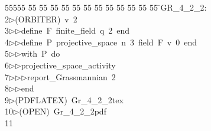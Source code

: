 %
%
\begin{tabbing}
55555 \= 55 \= 55 \= 55 \= 55 \= 55 \= 55 \= 55 \= 55 \= 55 \= 55 \= 55 \= 55 \= \>GR\_4\_2\_2:\\[0pt]
2\>$\triangleright$\>(ORBITER)\ v\ 2\ \\[0pt]
3\>$\triangleright$\>$\triangleright$\>define\ F\ finite\_field\ q\ 2\ end\ \\[0pt]
4\>$\triangleright$\>$\triangleright$\>define\ P\ projective\_space\ n\ 3\ field\ F\ v\ 0\ end\ \\[0pt]
5\>$\triangleright$\>$\triangleright$\>with\ P\ do\ \\[0pt]
6\>$\triangleright$\>$\triangleright$\>projective\_space\_activity\ \\[0pt]
7\>$\triangleright$\>$\triangleright$\>$\triangleright$\>report\_Grassmannian\ 2\ \\[0pt]
8\>$\triangleright$\>$\triangleright$\>end\\[0pt]
9\>$\triangleright$\>(PDFLATEX)\ Gr\_4\_2\_2tex\ \\[0pt]
10\>$\triangleright$\>(OPEN)\ Gr\_4\_2\_2pdf\\[0pt]
11\>\end{tabbing}
